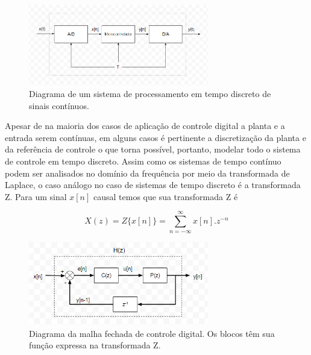 \begin{figure}[ht]
    \begin{center}
    \includegraphics[width=0.7\textwidth]{figuras/discreto.PNG}
    \end{center}
    \caption[Diagrama de um sistema de processamento em tempo discreto.]{Diagrama de um sistema de processamento em tempo discreto de sinais contínuos.}
    \label{disc}
\end{figure}

Apesar de na maioria dos casos de aplicação de controle digital a planta e a entrada serem contínuas, em alguns casos é pertinente a discretização da planta e da referência de controle o que torna possível, portanto, modelar todo o sistema de controle em tempo discreto. Assim como os sistemas de tempo contínuo podem ser analisados no domínio da frequência por meio da transformada de Laplace, o caso análogo no caso de sistemas de tempo discreto é a transformada Z. Para um sinal $x[n]$ causal temos que sua transformada Z é

\begin{equation}
    \label{eq:cd_1}
    X(z) = Z\{x[n]\} = \sum_{n=-\infty}^{\infty} x[n].z^{-n} 
\end{equation}

\begin{figure}[ht]
    \begin{center}
    \includegraphics[width=0.7\textwidth]{figuras/condig.PNG}
    \end{center}
    \caption[Diagrama da malha fechada de controle digital.]{Diagrama da malha fechada de controle digital. Os blocos têm sua função expressa na transformada Z.}
    \label{condig}
\end{figure}

